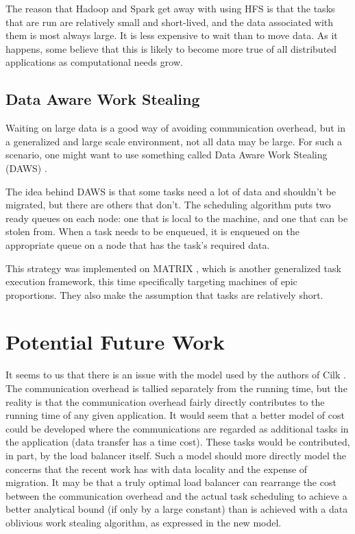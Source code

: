 \documentclass{article}
\begin{document}
The reason that Hadoop and Spark get away with using HFS is that the tasks that
are run are relatively small and short-lived, and the data associated with them
is most always large.  It is less expensive to wait than to move data.  As it
happens, some believe that this is likely to become more true of all distributed
applications as computational needs grow.


\subsection*{Data Aware Work Stealing}

Waiting on large data is a good way of avoiding communication overhead, but in a
generalized and large scale environment, not all data may be large.  For such a
scenario, one might want to use something called Data Aware Work Stealing (DAWS)
\autocite{KWKQISXZTLMLIR2016}.

The idea behind DAWS is that some tasks need a lot of data and shouldn't be
migrated, but there are others that don't.  The scheduling algorithm puts two
ready queues on each node: one that is local to the machine, and one that can be
stolen from.  When a task needs to be enqueued, it is enqueued on the
appropriate queue on a node that has the task's required data.

This strategy was implemented on MATRIX \autocite{ARKWIR2013}, which is another
generalized task execution framework, this time specifically targeting machines
of epic proportions.  They also make the assumption that tasks are relatively
short.


\section*{Potential Future Work}

It seems to us that there is an issue with the model used by the authors of Cilk
\autocite{RDBCEL1999}.  The communication overhead is tallied separately from
the running time, but the reality is that the communication overhead fairly
directly contributes to the running time of any given application.  It would
seem that a better model of cost could be developed where the communications are
regarded as additional tasks in the application (data transfer has a time cost).
These tasks would be contributed, in part, by the load balancer itself.  Such a
model should more directly model the concerns that the recent work has with data
locality and the expense of migration.  It may be that a truly optimal load
balancer can rearrange the cost between the communication overhead and the
actual task scheduling to achieve a better analytical bound (if only by a large
constant) than is achieved with a data oblivious work stealing algorithm, as
expressed in the new model.


\printbibliography
\end{document}
